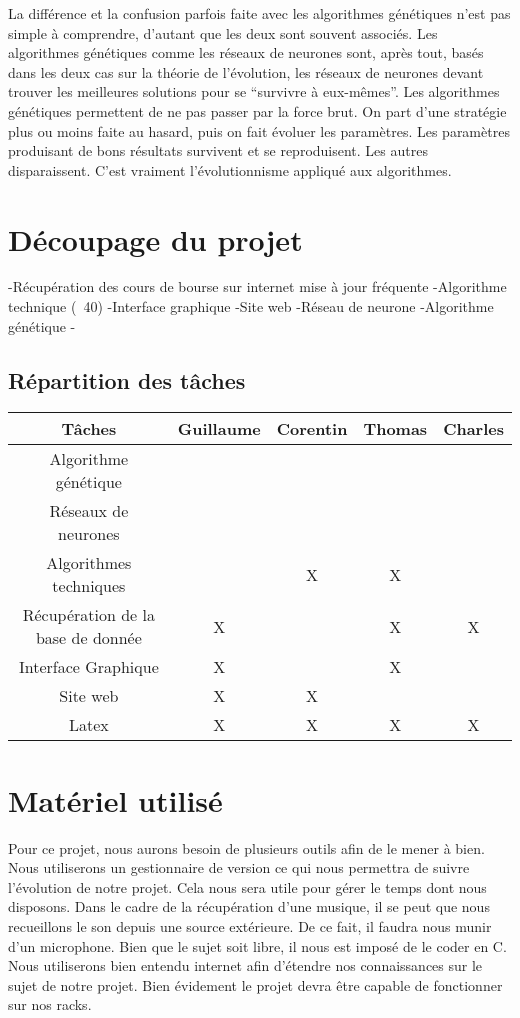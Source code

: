 \documentclass[a4paper,12pt]{article}
\begin{document}
La différence et la confusion parfois faite avec les algorithmes génétiques n’est pas simple à comprendre, d’autant que les deux sont souvent associés. Les algorithmes génétiques comme les réseaux de neurones sont, après tout, basés dans les deux cas sur la théorie de l’évolution, les réseaux de neurones devant trouver les meilleures solutions pour se “survivre à eux-mêmes”. Les algorithmes génétiques permettent de ne pas passer par la force brut. On part d’une stratégie plus ou moins faite au hasard, puis on fait évoluer les paramètres. Les paramètres produisant de bons résultats survivent et se reproduisent. Les autres disparaissent. C’est vraiment l’évolutionnisme appliqué aux algorithmes.

\newpage

\section{Découpage du projet}

-Récupération des cours de bourse sur internet mise à jour fréquente
-Algorithme technique (~40)
-Interface graphique 
-Site web
-Réseau de neurone 
-Algorithme génétique 
-

\newpage

\subsection{Répartition des tâches}
\begin{tabular}{|c||c|c|c|c|}
\hline
Tâches & Guillaume & Corentin & Thomas & Charles\\
\hline
Algorithme génétique & & & & \\
\hline
Réseaux de neurones & & & & \\
\hline
Algorithmes techniques & & X & X & \\
\hline
Récupération de la base de donnée & X & & X & X \\
\hline
Interface Graphique & X & & X &\\
\hline
Site web & X & X & &\\
\hline
Latex & X & X & X & X \\
\hline 
\end{tabular}

\section{Matériel utilisé}

Pour ce projet, nous aurons besoin de plusieurs outils afin de le mener à bien. Nous utiliserons un gestionnaire de version ce qui nous permettra de suivre l'évolution de notre projet. Cela nous sera utile pour gérer le temps dont nous disposons. Dans le cadre de la récupération d'une musique, il se peut que nous recueillons le son depuis une source extérieure. De ce fait, il faudra nous munir d'un microphone. Bien que le sujet soit libre, il nous est imposé de le coder en C. Nous utiliserons bien entendu internet afin d'étendre nos connaissances sur le sujet de notre projet. Bien évidement le projet devra être capable de fonctionner sur nos racks.
\end{document}
